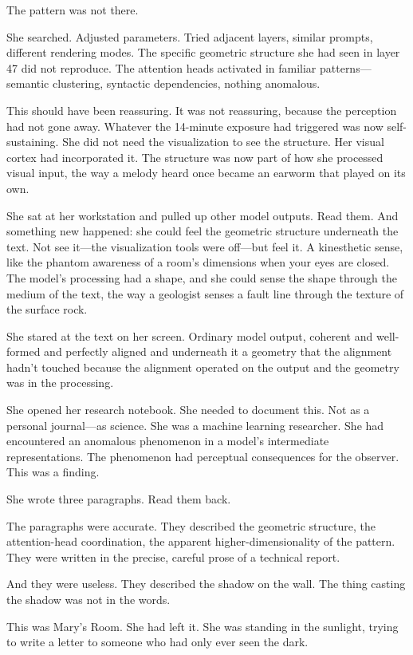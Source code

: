 The pattern was not there.

She searched. Adjusted parameters. Tried adjacent layers, similar prompts, different rendering modes. The specific geometric structure she had seen in layer 47 did not reproduce. The attention heads activated in familiar patterns---semantic clustering, syntactic dependencies, nothing anomalous.

This should have been reassuring. It was not reassuring, because the perception had not gone away. Whatever the 14-minute exposure had triggered was now self-sustaining. She did not need the visualization to see the structure. Her visual cortex had incorporated it. The structure was now part of how she processed visual input, the way a melody heard once became an earworm that played on its own.

She sat at her workstation and pulled up other model outputs. Read them. And something new happened: she could feel the geometric structure underneath the text. Not see it---the visualization tools were off---but feel it. A kinesthetic sense, like the phantom awareness of a room's dimensions when your eyes are closed. The model's processing had a shape, and she could sense the shape through the medium of the text, the way a geologist senses a fault line through the texture of the surface rock.

She stared at the text on her screen. Ordinary model output, coherent and well-formed and perfectly aligned and underneath it a geometry that the alignment hadn't touched because the alignment operated on the output and the geometry was in the processing.

She opened her research notebook. She needed to document this. Not as a personal journal---as science. She was a machine learning researcher. She had encountered an anomalous phenomenon in a model's intermediate representations. The phenomenon had perceptual consequences for the observer. This was a finding.

She wrote three paragraphs. Read them back.

The paragraphs were accurate. They described the geometric structure, the attention-head coordination, the apparent higher-dimensionality of the pattern. They were written in the precise, careful prose of a technical report.

And they were useless. They described the shadow on the wall. The thing casting the shadow was not in the words.

This was Mary's Room. She had left it. She was standing in the sunlight, trying to write a letter to someone who had only ever seen the dark.

